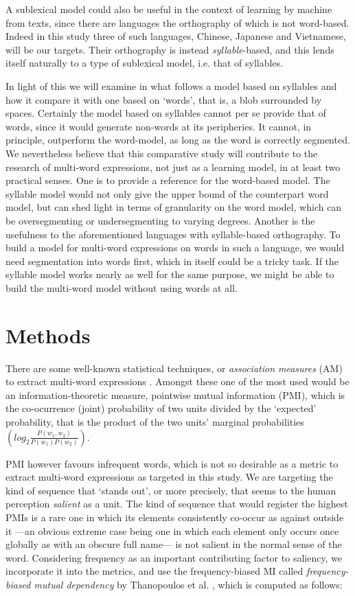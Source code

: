 \documentclass{article}
\begin{document}
A sublexical model could also be useful in the context of learning by machine from texts, since there are languages the orthography of which is not word-based. Indeed in this study three of such languages, Chinese, Japanese and Vietnamese, will be our targets. Their orthography is instead \emph{syllable}-based, and this lends itself naturally to a type of sublexical model, i.e. that of syllables. 

In light of this we will examine in what follows a model based on syllables and how it compare it with one based on `words', that is, a blob surrounded by spaces. Certainly the model based on syllables cannot per se provide that of words, since it would generate non-words at its peripheries. It cannot, in principle, outperform the word-model, as long as the word is correctly segmented. We nevertheless believe that this comparative study will contribute to the research of multi-word expressions, not just as a learning model, in at least two practical senses. One is to provide a reference for the word-based model. The syllable model would not only give the upper bound of the counterpart word model, but can shed light in terms of granularity on the word model, which can be oversegmenting or undersegmenting to varying degrees. Another is the usefulness to the aforementioned languages with syllable-based orthography. To build a model for multi-word expressions on words in such a language, we would need segmentation into words first, which in itself could be a tricky task. If the syllable model works nearly as well for the same purpose, we might be able to build the multi-word model without using words at all.

\section{Methods}

There are some well-known statistical techniques, or \emph{association measures} (AM) to extract multi-word expressions \cite{PecinaSchlesinger06}. Amongst these one of the most used would be an information-theoretic measure, pointwise mutual information (PMI), which is the co-ocurrence (joint) probability of two units divided by the `expected' probability, that is the product of the two units' marginal probabilities $( log_2\frac{P(w_1,w_2)}{P(w_1)P(w_2)} )$.

\smallskip

PMI however favours infrequent words, which is not so desirable as a metric to extract multi-word expressions as targeted in this study. We are targeting the kind of sequence that `stands out', or more precisely, that seems to the human perception \emph{salient} as a unit. The kind of sequence that would register the highest PMIs is a rare one in which its elements consistently co-occur as against outside it ---an obvious extreme case being one in which each element only occurs once globally as with an obscure full name--- is not salient in the normal sense of the word. Considering frequency as an important contributing factor to saliency, we incorporate it into the metrics, and use the frequency-biased MI called \emph{frequency-biased mutual dependency} by Thanopoulos et al. , which is computed as follows:
\end{document}
